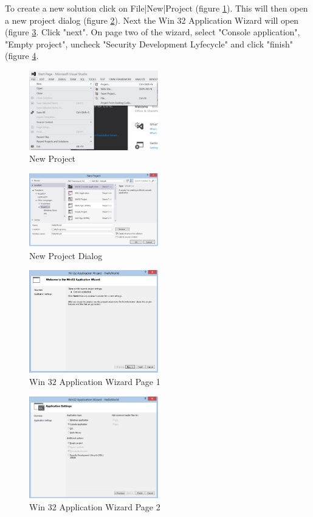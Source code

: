 To create a new solution click on File|New|Project (figure \ref{fig:new-project}). 
This will then open a new project dialog (figure  \ref{fig:new-project-dialog}).
Next the Win 32 Application Wizard will open (figure \ref{fig:win32-application-wizard-page1}.
Click "next". 
On page two of the wizard, select "Console application", "Empty project", uncheck "Security Development Lyfecycle" and click "finish" (figure \ref{fig:win32-application-wizard-page2}.
\begin{figure}
  \centering
  \includegraphics[width=0.5\textwidth]{diagrams/new_project.pdf}
  \caption{New Project}\label{fig:new-project}
\end{figure}
\begin{figure}
  \centering
  \includegraphics[width=0.5\textwidth]{diagrams/new_project_dialog.pdf}
  \caption{New Project Dialog}\label{fig:new-project-dialog}
\end{figure}
\begin{figure}
  \centering
  \includegraphics[width=0.5\textwidth]{diagrams/win32_application_wizard_page1.pdf}
  \caption{Win 32 Application Wizard Page 1}\label{fig:win32-application-wizard-page1}
\end{figure}
\begin{figure}
  \centering
  \includegraphics[width=0.5\textwidth]{diagrams/win32_application_wizard_page2.pdf}
  \caption{Win 32 Application Wizard Page 2}\label{fig:win32-application-wizard-page2}
\end{figure}